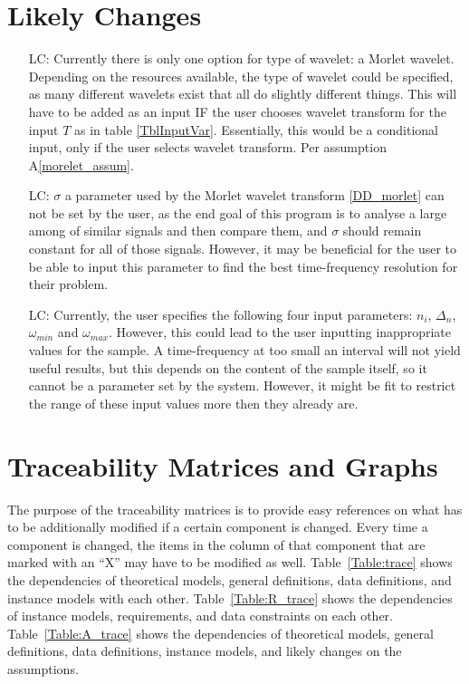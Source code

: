 \documentclass[12pt]{article}
\newcounter{lcnum} %
\begin{document}
\section{Likely Changes}    

\noindent \begin{itemize}
    
\item[LC\refstepcounter{lcnum}\thelcnum\label{LC_onlymorelet}:]  Currently there is only one option for type of wavelet: a Morlet wavelet. Depending on the resources available, the type of wavelet could be specified, as many different wavelets exist that all do slightly different things. This will have to be added as an input IF the user chooses wavelet transform for the input $T$ as in table \ref{TblInputVar}. Essentially, this would be a conditional input, only if the user selects wavelet transform. Per assumption A\ref{morelet_assum}.

\item[LC\refstepcounter{lcnum}\thelcnum\label{LC_sigma}:]  $\sigma$ a parameter used by the Morlet wavelet transform \ref{DD_morlet} can not be set by the user, as the end goal of this program is to analyse a large among of similar signals and then compare them, and $\sigma$ should remain constant for all of those signals. However, it may be beneficial for the user to be able to input this parameter to find the best time-frequency resolution for their problem.

\item[LC\refstepcounter{lcnum}\thelcnum\label{LC_user_input}:] Currently, the user specifies the following four input parameters: $n_i$, $\Delta_n$, $\omega_{min}$ and $\omega_{max}$. However, this could lead to the user inputting inappropriate values for the sample. A time-frequency at too small an interval will not yield useful results, but this depends on the content of the sample itself, so it cannot be a parameter set by the system. However, it might be fit to restrict the range of these input values more then they already are. 

\end{itemize}


\section{Traceability Matrices and Graphs}

The purpose of the traceability matrices is to provide easy references on what
has to be additionally modified if a certain component is changed.  Every time a
component is changed, the items in the column of that component that are marked
with an ``X'' may have to be modified as well.  Table~\ref{Table:trace} shows the
dependencies of theoretical models, general definitions, data definitions, and
instance models with each other. Table~\ref{Table:R_trace} shows the
dependencies of instance models, requirements, and data constraints on each
other. Table~\ref{Table:A_trace} shows the dependencies of theoretical models,
general definitions, data definitions, instance models, and likely changes on
the assumptions.
\end{document}
